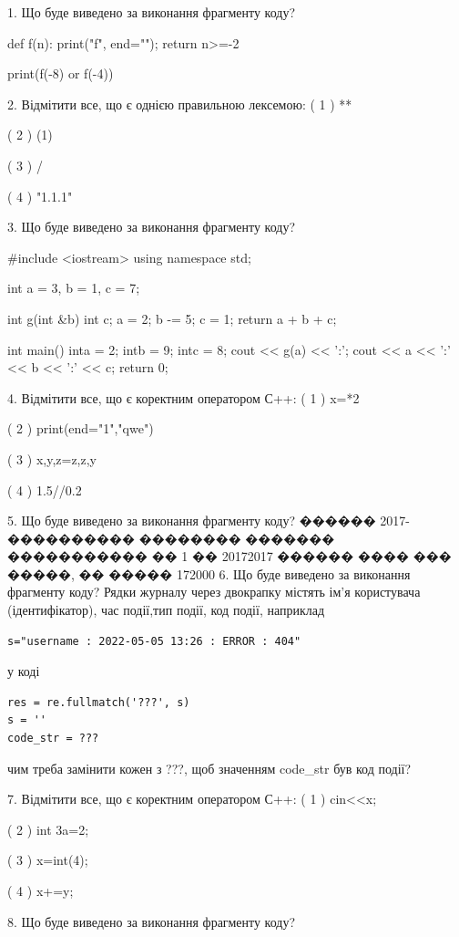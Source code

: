 \documentclass[11pt]{article}
\begin{document}
1. Що буде виведено за виконання фрагменту коду?

def f(n):
    print("f", end="");
    return n>=-2

print(f(-8) or f(-4))

2. Відмітити все, що є однією правильною лексемою:
( 1 ) **

( 2 ) (1)

( 3 ) /

( 4 ) "1.1.1"

3. Що буде виведено за виконання фрагменту коду?

#include <iostream>
using namespace std;

int a = 3, b = 1, c = 7;

int g(int &b){
int c;    a = 2;
    b -= 5;
    c = 1;
    return a + b + c;
}

int main(){
    inta = 2;
    intb = 9;
    intc = 8;
    cout << g(a) << ':';
    cout << a << ':' << b << ':' << c;
    return 0; 
}

4. Відмітити все, що є коректним оператором С++:
( 1 ) x=*2

( 2 ) print(end="1","qwe")

( 3 ) x,y,z=z,z,y

( 4 ) 1.5//0.2

5. Що буде виведено за виконання фрагменту коду?
������ 2017-���������� �������� ������� ����������� �� 1 �� 20172017 ������ ���� ��� �����, �� ����� 172000
6. Що буде виведено за виконання фрагменту коду?
Рядки журналу через двокрапку містять ім'я користувача (ідентифікатор), час події,тип події, код події, наприклад
\begin{verbatim}
s="username : 2022-05-05 13:26 : ERROR : 404"
\end{verbatim}
у коді 
\begin{verbatim}
res = re.fullmatch('???', s) 
s = ''
code_str = ??? 
\end{verbatim}
чим треба замінити кожен з ???, щоб значенням code\_str був код події? 



7. Відмітити все, що є коректним оператором С++:
( 1 ) cin<<x;

( 2 ) int 3a=2;

( 3 ) x=int(4);

( 4 ) x+=y;

8. Що буде виведено за виконання фрагменту коду?
\end{document}
